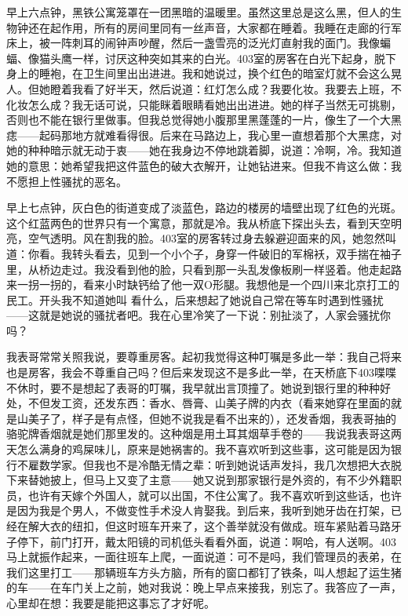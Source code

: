 早上六点钟，黑铁公寓笼罩在一团黑暗的温暖里。虽然这里总是这么黑，但人的生物钟还在起作用，所有的房间里同有一丝声音，大家都在睡着。我睡在走廊的行军床上，被一阵刺耳的闹钟声吵醒，然后一盏雪亮的泛光灯直射我的面门。我像蝙蝠、像猫头鹰一样，讨厌这种突如其来的白光。403室的房客在白光下起身，脱下身上的睡袍，在卫生间里出出进进。我和她说过，换个红色的暗室灯就不会这么晃人。但她瞪着我看了好半天，然后说道：红灯怎么成？我要化妆。我要去上班，不化妆怎么成？我无话可说，只能眯着眼睛看她出出进进。她的样子当然无可挑剔，否则也不能在银行里做事。但我总觉得她小腹那里黑蓬蓬的一片，像生了一个大黑痣——起码那地方就难看得很。后来在马路边上，我心里一直想着那个大黑痣，对她的种种暗示就无动于衷——她在我身边不停地跳着脚，说道：冷啊，冷。我知道她的意思：她希望我把这件蓝色的破大衣解开，让她钻进来。但我不肯这么做：我不愿担上性骚扰的恶名。 

早上七点钟，灰白色的街道变成了淡蓝色，路边的楼房的墙壁出现了红色的光斑。这个红蓝两色的世界只有一个寓意，那就是冷。我从桥底下探出头去，看到天空明亮，空气透明。风在割我的脸。403室的房客转过身去躲避迎面来的风，她忽然叫道：你看。我转头看去，见到一个小个子，身穿一件破旧的军棉袄，双手揣在袖子里，从桥边走过。我没看到他的脸，只看到那一头乱发像板刷一样竖着。他走起路来一拐一拐的，看来小时缺钙给了他一双O形腿。我想他是一个四川来北京打工的民工。开头我不知道她叫 看什么，后来想起了她说自己常在等车时遇到性骚扰——这就是她说的骚扰者吧。我在心里冷笑了一下说：别扯淡了，人家会骚扰你吗？ 



我表哥常常关照我说，要尊重房客。起初我觉得这种叮嘱是多此一举：我自己将来也是房客，我会不尊重自己吗？但后来发现这不是多此一举，在天桥底下403喋喋不休时，要不是想起了表哥的叮嘱，我早就出言顶撞了。她说到银行里的种种好处，不但发工资，还发东西：香水、唇膏、山美子牌的内衣（看来她穿在里面的就是山美子了，样子是有点怪，但她不说我是看不出来的），还发香烟，我表哥抽的骆驼牌香烟就是她们那里发的。这种烟是用土耳其烟草手卷的——我说我表哥这两天怎么满身的鸡屎味儿，原来是她祸害的。我不喜欢听到这些事，这可能是因为银行不雇数学家。但我也不是冷酷无情之辈：听到她说话声发抖，我几次想把大衣脱下来替她披上，但马上又变了主意——她又说到那家银行是外资的，有不少外籍职员，也许有天嫁个外国人，就可以出国，不住公寓了。我不喜欢听到这些话，也许是因为我是个男人，不做变性手术没人肯娶我。到后来，我听到她牙齿在打架，已经在解大衣的纽扣，但这时班车开来了，这个善举就没有做成。班车紧贴着马路牙子停下，前门打开，戴太阳镜的司机低头看看外面，说道：啊哈，有人送啊。403马上就振作起来，一面往班车上爬，一面说道：可不是吗，我们管理员的表弟，在我们这里打工——那辆班车方头方脑，所有的窗口都钉了铁条，叫人想起了运生猪的车——在车门关上之前，她对我说：晚上早点来接我，别忘了。我答应了一声，心里却在想：我要是能把这事忘了才好呢。 

